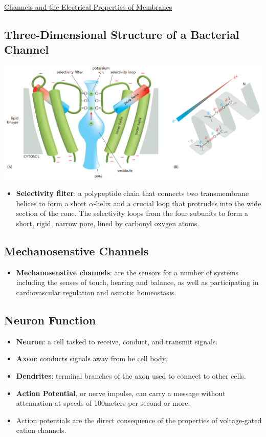 \documentclass[12pt,letterpaper]{article}
\begin{document}
\begin{secbox}{\hyperlink{11}{Channels and the Electrical Properties of Membranes}}
{    \hypertarget{11.3.4}{\subsection*{Three-Dimensional Structure of a Bacterial  Channel}}
    \includegraphics[width=\linewidth]{images/fig11-24.png}
    \begin{itemize}
        \item \textbf{Selectivity filter}: a polypeptide chain that connects two transmembrane helices to form a short \(\alpha\)-helix and a crucial loop that protrudes into the wide section of the cone. The selectivity loops from the four subunits to form a short, rigid, narrow pore, lined by carbonyl oxygen atoms.
    \end{itemize}

    \hypertarget{11.3.5}{\subsection*{Mechanosenstive Channels}}
    \begin{itemize}
        \item \textbf{Mechanosenstive channels}: are the sensors for a number of systems including the senses of touch, hearing and balance, as well as participating in cardiovascular regulation and osmotic homeostasis. 
    \end{itemize}

    \hypertarget{11.3.6}{\subsection*{Neuron Function}}
    \begin{itemize}
        \item \textbf{Neuron}: a cell tasked to receive, conduct, and transmit signals. 
        \item \textbf{Axon}: conducts signals away from he cell body.
        \item \textbf{Dendrites}: terminal branches of the axon used to connect to other cells. 
        \item \textbf{Action Potential}, or nerve impulse, can carry a message without attenuation at speeds of 100meters per second or more.
        \item Action potentials are the direct consequence of the properties of voltage-gated cation channels.
    \end{itemize}
    
}
\end{secbox}
\end{document}
